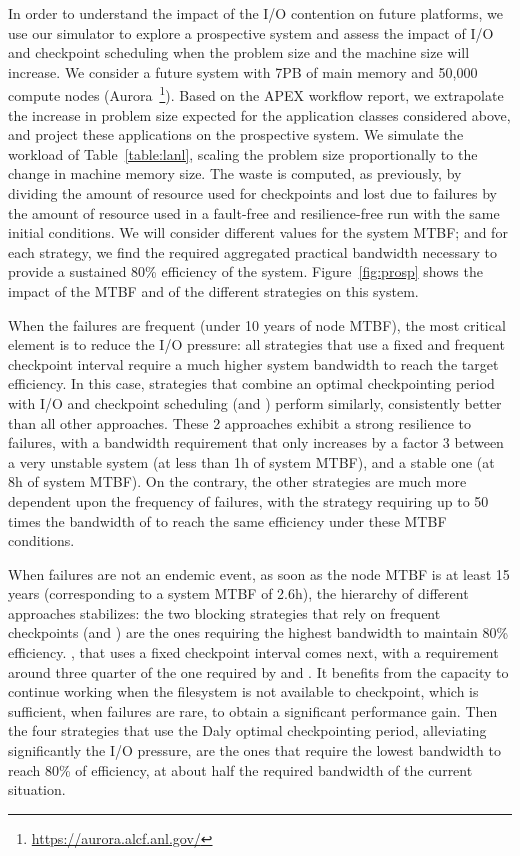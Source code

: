 In order to understand the impact of the I/O contention on future platforms, we
use our simulator to explore a prospective system and assess the impact of I/O
and checkpoint scheduling when the problem size and the machine size will
increase. We consider a future system with 7PB of main memory and 50,000 compute
nodes (Aurora~\footnote{\url{https://aurora.alcf.anl.gov/}}). Based on the APEX
workflow report, we extrapolate the increase in problem size expected for the
application classes considered above, and project these applications on the
prospective system.  We simulate the workload of Table~\ref{table:lanl}, scaling
the problem size proportionally to the change in machine memory size. The waste
is computed, as previously, by dividing the amount of resource used for
checkpoints and lost due to failures by the amount of resource used in a
fault-free and resilience-free run with the same initial conditions.
%
We will consider different values for the system MTBF; and for each strategy, we
find the required aggregated practical bandwidth necessary to provide a
sustained 80\% efficiency of the system.
%
Figure~\ref{fig:prosp} shows the impact of the MTBF and of the
different strategies on this system.

When the failures are frequent (under 10 years of node MTBF), the most critical
element is to reduce the I/O pressure: all strategies that use a fixed and
frequent checkpoint interval require a much higher system bandwidth to reach the
target efficiency.  In this case, strategies that combine an optimal
checkpointing period with I/O and checkpoint scheduling (\cooperative and
\fifodaly) perform similarly, consistently better than all other approaches.
These 2 approaches exhibit a strong resilience to failures, with a bandwidth
requirement that only increases by a factor 3 between a very unstable system (at
less than 1h of system MTBF), and a stable one (at 8h of system MTBF). On the
contrary, the other strategies are much more dependent upon the frequency of
failures, with the \propfixed strategy requiring up to 50 times the bandwidth of
\cooperative to reach the same efficiency under these MTBF conditions.

When failures are not an endemic
event, \ie as soon as the node MTBF is at least 15 years
(corresponding to a system MTBF of 2.6h), the hierarchy of different
approaches stabilizes: the two blocking strategies that rely on
frequent checkpoints (\propfixed and \bfifofixed) are the ones
requiring the highest bandwidth to maintain 80\%
efficiency. %
\fifofixed, that uses a fixed checkpoint interval comes next, with a
requirement around three quarter of the one required by \propfixed and
\fifofixed. It benefits from the capacity to continue working when the
filesystem is not available to checkpoint, which is sufficient, when
failures are rare, to obtain a significant performance
gain. %
Then the four strategies that use the Daly optimal checkpointing
period, alleviating significantly the I/O pressure, are the ones that
require the lowest bandwidth to reach 80\% of efficiency, at about
half the required bandwidth of the current
situation. %
